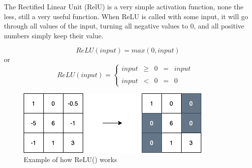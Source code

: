 The Rectified Linear Unit (RelU) is a very simple activation function, none the less, still a very useful function. When ReLU is called with some input, it will go through all values of the input, turning all negative values to 0, and all positive numbers simply keep their value.

$$
ReLU(input) = max(0,input)
$$
or
$$
ReLU(input) =
\left\{ \begin{matrix}
        input& \geq& 0& =& input& \\
        \\
        input& <& 0& =& 0&
\end{matrix}
\right.
$$


\begin{figure}[!ht]
  \centering
  \includegraphics[scale=0.4]{latex/imgs/relu.png}
  \caption{Example of how ReLU() works}\label{Baseline:before}
\end{figure}
